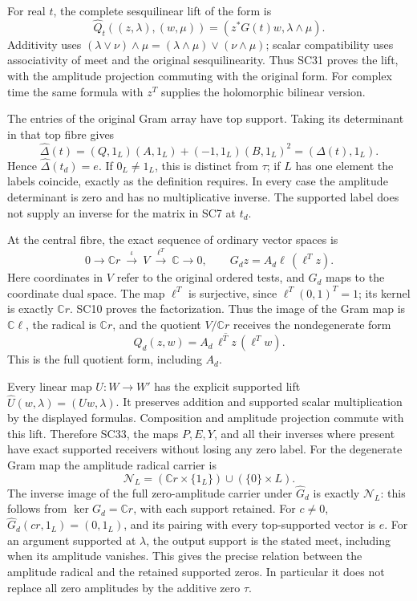 For real \(t\), the complete sesquilinear lift of the form is
\[
 \widehat Q_t((z,\lambda),(w,\mu))
  =(z^*G(t)w,\lambda\wedge\mu).
 \tag{SC31}
\]
Additivity uses
\((\lambda\vee\nu)\wedge\mu
=(\lambda\wedge\mu)\vee(\nu\wedge\mu)\);
scalar compatibility uses associativity of meet and the
original sesquilinearity. Thus SC31 proves the lift, with the
amplitude projection commuting with the original form.
For complex time the same formula with \(z^T\) supplies the
holomorphic bilinear version.

The entries of the original Gram array have top support.
Taking its determinant in that top fibre gives
\[
 \widehat\Delta(t)
 =(Q,1_L)(A,1_L)+(-1,1_L)(B,1_L)^2
 =(\Delta(t),1_L).
 \tag{SC32}
\]
Hence \(\widehat\Delta(t_d)=e\). If \(0_L\ne1_L\), this is
distinct from \(\tau\); if \(L\) has one element the labels
coincide, exactly as the definition requires. In every case the
amplitude determinant is zero and has no multiplicative
inverse. The supported label does not supply an inverse for
the matrix in SC7 at \(t_d\).

At the central fibre, the exact sequence of ordinary vector
spaces is
\[
 0\longrightarrow\mathbb Cr
 \ \xrightarrow{\ \iota\ }\ V
 \ \xrightarrow{\ \ell^T\ }\ \mathbb C
 \longrightarrow0,\qquad
 G_dz=A_d\ell\,(\ell^Tz).
 \tag{SC33}
\]
Here coordinates in \(V\) refer to the original ordered tests,
and \(G_d\) maps to the coordinate dual space. The map
\(\ell^T\) is surjective, since \(\ell^T(0,1)^T=1\);
its kernel is exactly \(\mathbb Cr\). SC10 proves the
factorization. Thus the image of the Gram map is
\(\mathbb C\ell\), the radical is \(\mathbb Cr\), and the
quotient \(V/\mathbb Cr\) receives the nondegenerate form
\[
 Q_d(z,w)=A_d\,\overline{\ell^Tz}\,(\ell^Tw).
 \tag{SC34}
\]
This is the full quotient form, including \(A_d\).

Every linear map \(U:W\to W'\) has the explicit supported lift
\(\widehat U(w,\lambda)=(Uw,\lambda)\).
It preserves addition and supported scalar multiplication by
the displayed formulas. Composition and amplitude projection
commute with this lift. Therefore SC33, the maps \(P,E,Y\),
and all their inverses where present have exact supported
receivers without losing any zero label.
For the degenerate Gram map the amplitude radical carrier is
\[
 \mathcal N_L=(\mathbb Cr\times\{1_L\})
               \cup(\{0\}\times L).
 \tag{SC35}
\]
The inverse image of the full zero-amplitude carrier under
\(\widehat G_d\) is exactly \(\mathcal N_L\): this follows
from \(\ker G_d=\mathbb Cr\), with each support retained.
For \(c\ne0\), \(\widehat G_d(cr,1_L)=(0,1_L)\), and its
pairing with every top-supported vector is \(e\).
For an argument supported at \(\lambda\), the output support
is the stated meet, including when its amplitude vanishes.
This gives the precise relation between the amplitude radical
and the retained supported zeros. In particular it does not
replace all zero amplitudes by the additive zero \(\tau\).

